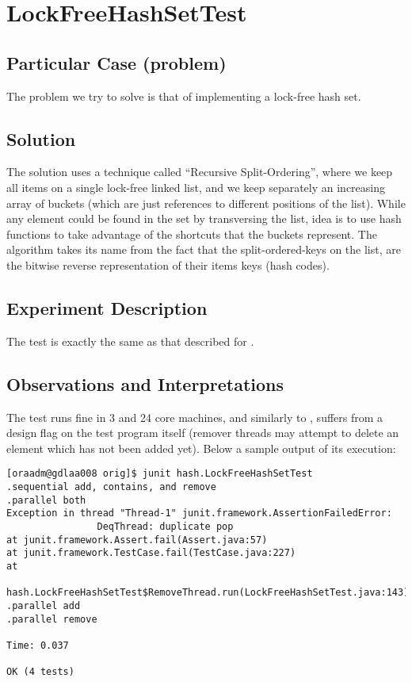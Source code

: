 \section{\textbf{LockFreeHashSetTest}}

\subsection{Particular Case (problem)}
The problem we try to solve is that of implementing a lock-free hash
set.

\subsection{Solution}
The solution uses a technique called ``Recursive Split-Ordering'',
where we keep all items on a single lock-free linked list, and we keep
separately an increasing array of buckets (which are just references
to different positions of the list). While any element could be found
in the set by transversing the list, idea is to use hash functions to
take advantage of the shortcuts that the buckets represent. The
algorithm takes its name from the fact that the split-ordered-keys on
the list, are the bitwise reverse representation of their items keys
(hash codes). 

\subsection{Experiment Description}
The test is exactly the same as that described for
. 

\subsection{Observations and Interpretations}
The test runs fine in 3 and 24 core machines, and similarly to
, suffers from a design flag on the test
program itself (remover threads may attempt to delete an element which
has not been added yet). Below a sample output of its execution: 

\begin{verbatim}
[oraadm@gdlaa008 orig]$ junit hash.LockFreeHashSetTest
.sequential add, contains, and remove
.parallel both
Exception in thread "Thread-1" junit.framework.AssertionFailedError:
                DeqThread: duplicate pop
at junit.framework.Assert.fail(Assert.java:57)
at junit.framework.TestCase.fail(TestCase.java:227)
at
                
hash.LockFreeHashSetTest$RemoveThread.run(LockFreeHashSetTest.java:143)
.parallel add
.parallel remove

Time: 0.037

OK (4 tests)
\end{verbatim}
\hfill

